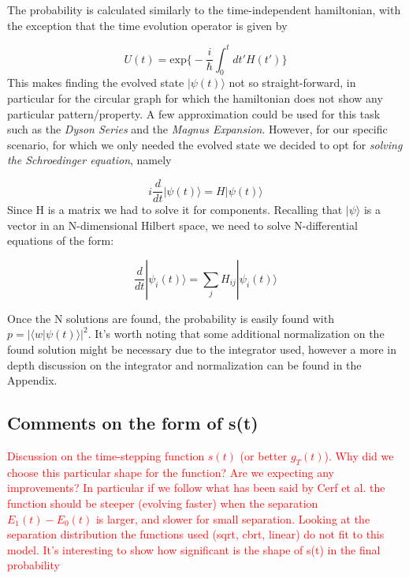 \documentclass[aps,pra,reprint, onecolumn]{revtex4-2}
\newcommand{\red}[1]{\textcolor{red}{#1}}
\begin{document}
The probability is calculated similarly to the time-independent hamiltonian, with the exception that the time evolution operator is given by

\begin{equation}
U(t) = \mbox{exp} \Big\{ -\frac{i}{\hbar} \int_{0}^{t}dt'H(t') \Big\}
\end{equation}
This makes finding the evolved state $|\psi(t)\rangle$ not so straight-forward, in particular for the circular graph for which the hamiltonian does not show any particular pattern/property. A few approximation could be used for this task such as the \textit{Dyson Series} and the \textit{Magnus Expansion}. However, for our specific scenario, for which we only needed the evolved state we decided to opt for \textit{solving the Schroedinger equation}, namely

\begin{equation}
  i\frac{d}{dt}|\psi(t)\rangle = H |\psi(t)\rangle
\end{equation}
Since H is a matrix we had to solve it for components. Recalling that $|\psi\rangle$ is a vector in an N-dimensional Hilbert space, we need to solve N-differential equations of the form:

\begin{equation}
\frac{d}{dt}|\psi_i(t)\rangle = \sum_jH_{ij}|\psi_i(t)\rangle
\end{equation}

Once the N solutions are found, the probability is easily found with $p=|\langle w |\psi(t)\rangle|^2$. It's worth noting that some additional normalization on the found solution might be necessary due to the integrator used, however a more in depth discussion on the integrator and normalization can be found in the Appendix.


\subsection{Comments on the form of s(t)}
\red{Discussion on the time-stepping function $s(t)$ (or better  $g_T(t)$). Why did we choose this particular shape for the function? Are we expecting any improvements? In particular if we follow what has been said by Cerf et al. the function should be steeper (evolving faster) when the separation $E_1(t)-E_0(t)$ is larger, and slower for small separation. Looking at the separation distribution the functions used (sqrt, cbrt, linear) do not fit to this model. It's interesting to show how significant is the shape of s(t) in the final probability}
\end{document}
